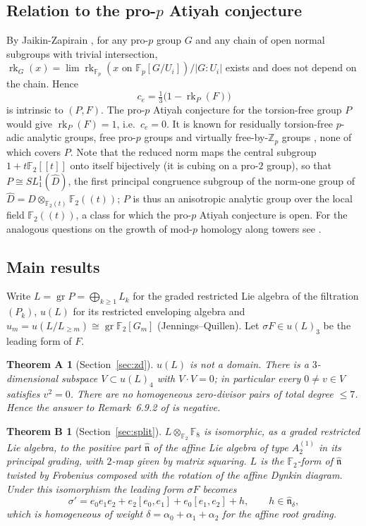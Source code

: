\documentclass[11pt]{amsart}
\newtheorem*{theoremA}{Theorem A}
\newtheorem*{theoremB}{Theorem B}
\theoremstyle{definition}
\newcommand{\F}{\mathbb{F}}
\newcommand{\Z}{\mathbb{Z}}
\newcommand{\gr}{\operatorname{gr}}
\newcommand{\rk}{\operatorname{rk}}
\newcommand{\hatn}{\widehat{\mathfrak n}}
\begin{document}
\subsection{Relation to the pro-$p$ Atiyah conjecture}
By Jaikin-Zapirain \cite[Prop.~11.2]{JZsurvey}, for any pro-$p$ group $G$ and any chain of open normal
subgroups with trivial intersection, $\rk_G(x)=\lim\rk_{\F_p}(x\text{ on }\F_p[G/U_i])/|G:U_i|$ exists and does not
depend on the chain. Hence
\[
  c_e=\tfrac13\bigl(1-\rk_P(F)\bigr)
\]
is intrinsic to $(P,F)$. The pro-$p$ Atiyah conjecture \cite[Conj.~11.1]{JZsurvey} for the torsion-free group $P$
would give $\rk_P(F)=1$, i.e.\ $c_e=0$. It is known for residually torsion-free $p$-adic analytic groups, free
pro-$p$ groups and virtually free-by-$\Z_p$ groups \cite{JZS}, none of which covers $P$. Note that the reduced norm
maps the central subgroup $1+t\F_2[[t]]$ onto itself bijectively (it is cubing on a pro-$2$ group), so that
$P\cong SL_1^1(\widehat D)$, the first principal congruence subgroup of the norm-one group of
$\widehat D=D\otimes_{\F_2(t)}\F_2((t))$;
$P$ is thus an anisotropic analytic group over the local field $\F_2((t))$, a class for which the pro-$p$ Atiyah
conjecture is open. For the analogous questions on the growth of mod-$p$ homology along towers see \cite{EL,Fraczyk}.

\subsection{Main results}
Write $L=\gr P=\bigoplus_{k\ge1}L_k$ for the graded restricted Lie algebra of the filtration $(P_k)$,
$u(L)$ for its restricted enveloping algebra and $u_m=u(L/L_{\ge m})\cong\gr\F_2[G_m]$ (Jennings--Quillen).
Let $\sigma F\in u(L)_3$ be the leading form of $F$.

\begin{theoremA}[Section~\ref{sec:zd}]
$u(L)$ is not a domain. There is a $3$-dimensional subspace $V\subset u(L)_4$ with $V\cdot V=0$; in particular every
$0\ne v\in V$ satisfies $v^2=0$. There are no homogeneous zero-divisor pairs of total degree $\le 7$.
Hence the answer to Remark~6.9.2 of \cite{ChenIII} is negative.
\end{theoremA}

\begin{theoremB}[Section~\ref{sec:split}]
$L\otimes_{\F_2}\F_8$ is isomorphic, as a graded restricted Lie algebra, to the positive part $\hatn$ of the affine
Lie algebra of type $A_2^{(1)}$ in its principal grading, with $2$-map given by matrix squaring. $L$ is the $\F_2$-form
of $\hatn$ twisted by Frobenius composed with the rotation of the affine Dynkin diagram. Under this isomorphism the
leading form $\sigma F$ becomes
\[
  \sigma'=e_0e_1e_2+e_2[e_0,e_1]+e_0[e_1,e_2]+h,\qquad h\in\hatn_\delta ,
\]
which is homogeneous of weight $\delta=\alpha_0+\alpha_1+\alpha_2$ for the affine root grading.
\end{theoremB}
\end{document}
